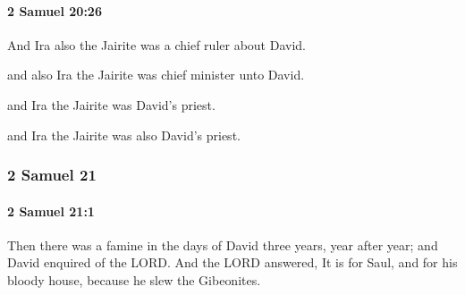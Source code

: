 		\paragraph{2 Samuel 20:26} %
			\label{2SAMUEL-20-26}

			And Ira also the Jairite was a chief ruler about David.

			\begin{versebox}
					\item[BHS] 
					\item[ASV] and also Ira the Jairite was chief minister unto David.
					\item[NIV] and Ira the Jairite was David’s priest.
					\item[NRSV] and Ira the Jairite was also David’s priest.
			\end{versebox}
	\subsubsection{2 Samuel 21} %
		\label{2SAMUEL-21}

		\paragraph{2 Samuel 21:1} %
			\label{2SAMUEL-21-1}

			Then there was a famine in the days of David three years, year after year; and David enquired of the LORD. And the LORD answered, It is for Saul, and for his bloody house, because he slew the Gibeonites.

